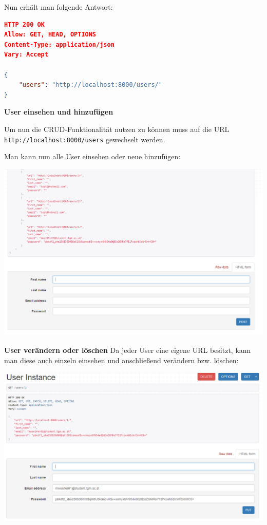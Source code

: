 Nun erhält man folgende Antwort:

\begin{lstlisting}[language=JSON]
HTTP 200 OK
Allow: GET, HEAD, OPTIONS
Content-Type: application/json
Vary: Accept

{
	"users": "http://localhost:8000/users/"
}
\end{lstlisting}


\textbf{User einsehen und hinzufügen}

Um nun die CRUD-Funktionalität nutzen zu können muss auf die URL \verb|http://localhost:8000/users| gewechselt werden.

Man kann nun alle User einsehen oder neue hinzufügen:

\begin{minipage}{\linewidth}
	\centering
	\includegraphics[width=1\linewidth]{images/read_add}
\end{minipage}

\clearpage
\textbf{User verändern oder löschen}
Da jeder User eine eigene URL besitzt, kann man diese auch einzeln einsehen und anschließend verändern bzw. löschen:

\begin{minipage}{\linewidth}
	\centering
	\includegraphics[width=1\linewidth]{images/change_delete}
\end{minipage}

